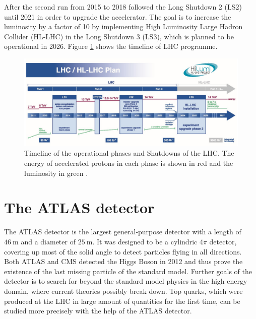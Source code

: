 After the second run from 2015 to 2018 followed the Long Shutdown 2 (LS2) until 2021 in order to upgrade the accelerator. The goal is to increase the luminosity by a factor of 10 by
implementing High Luminosity Large Hadron Collider (HL-LHC) in the Long Shutdown 3 (LS3), which is planned to be operational in 2026. Figure \ref{fig:lhc_plan} shows the timeline
of LHC programme.

\begin{figure}
  \centering
  \includegraphics[height=0.4\textwidth]{images/lhc_plan.png}
  \caption{Timeline of the operational phases and Shutdowns of the LHC. The energy of accelerated protons in each phase is shown in red and the luminosity in green \cite{lhc_plan}.}
  \label{fig:lhc_plan}
\end{figure}

\section{The ATLAS detector}
The ATLAS detector is the largest general-purpose detector with a length of $\SI{46}{\meter}$ and a diameter of $\SI{25}{\meter}$.
It was designed to be a cylindric $4\pi$ detector, covering up most of the solid angle to detect particles flying in all directions.
Both ATLAS and CMS detected the Higgs Boson in 2012 and thus prove the existence of the last missing particle of the standard model.
Further goals of the detector is to search for beyond the standard model physics in the high energy domain, where current theories possibly break down.
Top quarks, which were produced at the LHC in large amount of quantities for the first time, can be studied more precisely with the help of the ATLAS detector.

